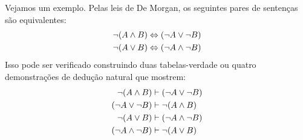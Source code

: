 Vejamos um exemplo. Pelas leis de De Morgan, os seguintes pares de sentenças são equivalentes:
\begin{align*}
	\neg (A \wedge B) & \Leftrightarrow (\neg A \vee \neg B)\\
	\neg (A \vee B) & \Leftrightarrow (\neg A \wedge \neg B)
\end{align*}
Isso pode ser verificado construindo duas tabelas-verdade ou quatro demonstrações de dedução natural que mostrem:
\begin{align*}
	\neg (A \wedge B) & \vdash (\neg A \vee \neg B)\\
	(\neg A \vee \neg B) & \vdash \neg (A \wedge B)\\
	\neg (A \vee B) & \vdash (\neg A \wedge \neg B)\\
	(\neg A \wedge \neg B) & \vdash \neg (A \vee B)
\end{align*}

